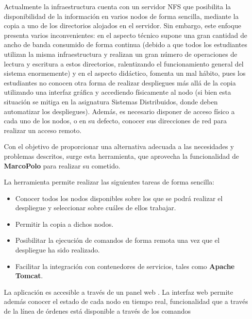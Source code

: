 Actualmente la infraestructura cuenta con un servidor NFS que posibilita la disponibilidad de la información en varios nodos de forma sencilla, mediante la copia a uno de los directorios alojados en el servidor. Sin embargo, este enfoque presenta varios inconvenientes: en el aspecto técnico supone una gran cantidad de ancho de banda consumido de forma continua (debido a que todos los estudiantes utilizan la misma infraestructura y realizan un gran número de operaciones de lectura y escritura a estos directorios, ralentizando el funcionamiento general del sistema enormemente) y en el aspecto didáctico, fomenta un mal hábito, pues los estudiantes no conocen otra forma de realizar despliegues más allá de la copia utilizando una interfaz gráfica y accediendo físicamente al nodo (si bien esta situación se mitiga en la asignatura Sistemas Distribuidos, donde deben automatizar los despliegues). Además, es necesario disponer de acceso físico a cada uno de los nodos, o en su defecto, conocer sus direcciones de red para realizar un acceso remoto.

Con el objetivo de proporcionar una alternativa adecuada a las necesidades y problemas descritos, surge esta herramienta, que aprovecha la funcionalidad de \textbf{MarcoPolo} para realizar su cometido.

La herramienta permite realizar las siguientes tareas de forma sencilla:

\begin{itemize}
\item Conocer todos los nodos disponibles sobre los que se podrá realizar el despliegue y seleccionar sobre cuáles de ellos trabajar.
\item Permitir la copia a dichos nodos.
\item Posibilitar la ejecución de comandos de forma remota una vez que el despliegue ha sido realizado.
\item Facilitar la integración con contenedores de servicios, tales como \textbf{Apache Tomcat}.
\end{itemize}

La aplicación es accesible a través de un panel web %
. La interfaz web permite además conocer el estado de cada nodo en tiempo real, funcionalidad que a través de la línea de órdenes está disponible a través de los comandos %


